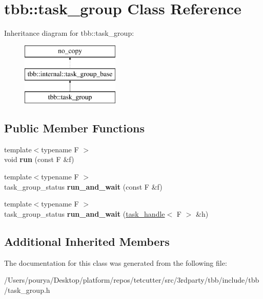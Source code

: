 \hypertarget{classtbb_1_1task__group}{}\section{tbb\+:\+:task\+\_\+group Class Reference}
\label{classtbb_1_1task__group}
Inheritance diagram for tbb\+:\+:task\+\_\+group\+:\begin{figure}[H]
\begin{center}
\leavevmode
\includegraphics[height=3.000000cm]{classtbb_1_1task__group}
\end{center}
\end{figure}
\subsection*{Public Member Functions}
\begin{DoxyCompactItemize}
\item 
\hypertarget{classtbb_1_1task__group_a6355cce7750b1367fb98924af151e8b2}{}{\footnotesize template$<$typename F $>$ }\\void {\bfseries run} (const F \&f)\label{classtbb_1_1task__group_a6355cce7750b1367fb98924af151e8b2}

\item 
\hypertarget{classtbb_1_1task__group_aeef1b473ff0edaf3f356722b13e877b0}{}{\footnotesize template$<$typename F $>$ }\\task\+\_\+group\+\_\+status {\bfseries run\+\_\+and\+\_\+wait} (const F \&f)\label{classtbb_1_1task__group_aeef1b473ff0edaf3f356722b13e877b0}

\item 
\hypertarget{classtbb_1_1task__group_a543903ef748fd10eb864c27a2e8ac18b}{}{\footnotesize template$<$typename F $>$ }\\task\+\_\+group\+\_\+status {\bfseries run\+\_\+and\+\_\+wait} (\hyperlink{classtbb_1_1task__handle}{task\+\_\+handle}$<$ F $>$ \&h)\label{classtbb_1_1task__group_a543903ef748fd10eb864c27a2e8ac18b}

\end{DoxyCompactItemize}
\subsection*{Additional Inherited Members}


The documentation for this class was generated from the following file\+:\begin{DoxyCompactItemize}
\item 
/\+Users/pourya/\+Desktop/platform/repos/tetcutter/src/3rdparty/tbb/include/tbb/task\+\_\+group.\+h\end{DoxyCompactItemize}
